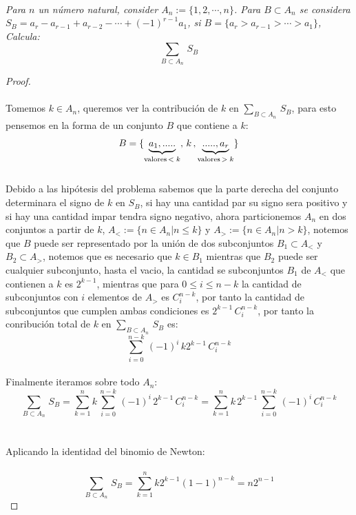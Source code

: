 \documentclass[11pt,letterpaper]{article}
\begin{document}
\,\\
\begin{tcolorbox}[
	title = \textcolor{black}{\textcolor{white}{Problema 1}},]
\textit{ Para $n$ un n\'umero natural, consider $A_n:=\{1,2,\cdots,n\}$. Para $B\subset A_n$ se considera \\
$S_B=a_r-a_{r-1}+a_{r-2}-\cdots+(-1)^{r-1}a_1$, si $B=\{a_r>a_{r-1}>\cdots>a_1\}$, Calcula:
\begin{equation*}
    \sum_{B\subset A_n}\,S_B
\end{equation*}}
\end{tcolorbox}
\begin{proof}\,\\
    \,\\
Tomemos $k\in A_n$, queremos ver la contribuci\'on de $k$ en $\sum_{B\subset A_n}\,S_B$, para esto pensemos en la forma 
de un conjunto $B$ que contiene a $k$:\,\\
\begin{equation*}
    B=\{\underbrace{a_1,.....}_\text{valores\,$<k$},\,k\,,\underbrace{.....,a_r}_\text{valores\,$>k$}\}
\end{equation*}\,\\
Debido a las hip\'otesis del problema sabemos que la parte derecha del conjunto determinara el signo de $k$ en $S_B$, si hay una cantidad par su signo sera positivo y si hay una cantidad impar tendra signo negativo, ahora particionemos $A_n$ en dos conjuntos a partir de $k$,
$A_<:=\{n\in A_n|n\leq k\}$ y $A_>:=\{n\in A_n|n>k\}$, notemos que $B$ puede ser representado por la uni\'on de dos subconjuntos $B_1\subset A_<$ y $B_2\subset A_>$, notemos que es necesario que $k\in B_1$ mientras que $B_2$ puede ser cualquier subconjunto, hasta el vacio, la cantidad se subconjuntos $B_1$ de $A_<$ que contienen a $k$ es $2^{k-1}$, mientras que para 
$0\leq i\leq n-k$ la cantidad de subconjuntos con $i$ elementos de $A_>$ es $C^{n-k}_i$, por tanto la cantidad de subconjuntos que cumplen ambas condiciones es $2^{k-1}\,C^{n-k}_{i}$, por tanto la conribuci\'on total de $k$ en $\sum_{B\subset A_n}\,S_B$ es:
\begin{equation*}
    \sum_{i=0}^{n-k}\,(-1)^{i}\,k2^{k-1}\,C^{n-k}_{i}
\end{equation*}\,\\
Finalmente iteramos sobre todo $A_n$:\,\\
\begin{equation*}
    \sum_{B\subset A_n}\,S_B=\sum_{k=1}^n k\,\sum_{i=0}^{n-k}\,(-1)^{i}\,2^{k-1}\,C^{n-k}_{i}=\sum_{k=1}^{n}k\,2^{k-1}\, \sum_{i=0}^{n-k}\,(-1)^{i}\,C^{n-k}_{i}
\end{equation*}\,\\
\,\\
Aplicando la identidad del binomio de Newton:\,\\
\,\\
\begin{equation*}
    \sum_{B\subset A_n}\,S_B=\sum_{k=1}^{n}k2^{k-1}(1-1)^{n-k}=n2^{n-1}
\end{equation*}
\end{proof}
\end{document}
